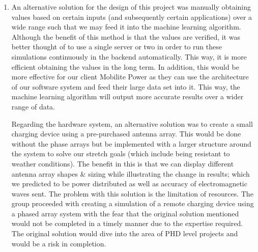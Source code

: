 \documentclass[12pt, titlepage]{article}
\begin{document}
\begin{enumerate}
  \item An alternative solution for the design of this project was manually obtaining values based on certain inputs (and subsequently certain applications) over a wide range such that we may feed it into the machine learning algorithm. Although the benefit of this method is that the values are verified, it was better thought of to use a single server or two in order to run these simulations continuously in the backend automatically. This way, it is more efficient obtaining the values in the long term. In addition, this would be more effective for our client Mobilite Power as they can use the architecture of our software system and feed their large data set into it. This way, the machine learning algorithm will output more accurate results over a wider range of data. \par 
  Regarding the hardware system, an alternative solution was to create a small charging device using a pre-purchased antenna array. This would be done without the phase arrays but be implemented with a larger structure around the system to solve our stretch goals (which include being resistant to weather conditions). The benefit in this is that we can display different antenna array shapes \& sizing while illustrating the change in results; which we predicted to be power distributed as well as accuracy of electromagnetic waves sent. The problem with this solution is the limitation of resources. The group proceeded with creating a simulation of a remote charging device using a phased array system with the fear that the original solution mentioned would not be completed in a timely manner due to the expertise required. The original solution would dive into the area of PHD level projects and would be a risk in completion.   

\end{enumerate}
\end{document}
